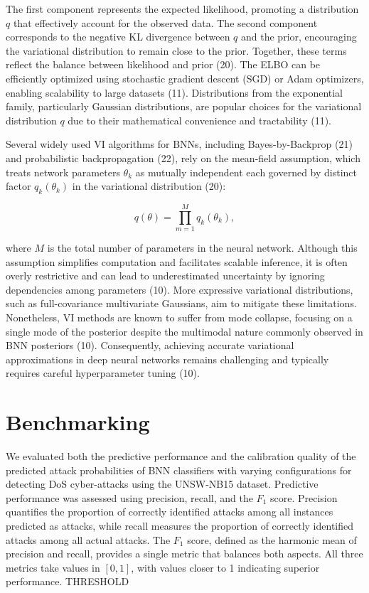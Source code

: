 \documentclass[
  a4paper,
]{scrreprt}
\begin{document}
The first component represents the expected likelihood, promoting a
distribution \(q\) that effectively account for the observed data. The
second component corresponds to the negative KL divergence between \(q\)
and the prior, encouraging the variational distribution to remain close
to the prior. Together, these terms reflect the balance between
likelihood and prior (20). The ELBO can be efficiently optimized using
stochastic gradient descent (SGD) or Adam optimizers, enabling
scalability to large datasets (11). Distributions from the exponential
family, particularly Gaussian distributions, are popular choices for the
variational distribution \(q\) due to their mathematical convenience and
tractability (11).

Several widely used VI algorithms for BNNs, including Bayes-by-Backprop
(21) and probabilistic backpropagation (22), rely on the mean-field
assumption, which treats network parameters \(\theta_k\) as mutually
independent each governed by distinct factor \(q_{k}(\theta_k)\) in the
variational distribution (20):

\[
q(\theta)=\prod_{m=1}^{M}{q_{k}(\theta_k)},
\]

where \(M\) is the total number of parameters in the neural network.
Although this assumption simplifies computation and facilitates scalable
inference, it is often overly restrictive and can lead to underestimated
uncertainty by ignoring dependencies among parameters (10). More
expressive variational distributions, such as full-covariance
multivariate Gaussians, aim to mitigate these limitations. Nonetheless,
VI methods are known to suffer from mode collapse, focusing on a single
mode of the posterior despite the multimodal nature commonly observed in
BNN posteriors (10). Consequently, achieving accurate variational
approximations in deep neural networks remains challenging and typically
requires careful hyperparameter tuning (10).

\section{Benchmarking}\label{benchmarking}

We evaluated both the predictive performance and the calibration quality
of the predicted attack probabilities of BNN classifiers with varying
configurations for detecting DoS cyber-attacks using the UNSW-NB15
dataset. Predictive performance was assessed using precision, recall,
and the \(F_1\) score. Precision quantifies the proportion of correctly
identified attacks among all instances predicted as attacks, while
recall measures the proportion of correctly identified attacks among all
actual attacks. The \(F_1\) score, defined as the harmonic mean of
precision and recall, provides a single metric that balances both
aspects. All three metrics take values in \([0,1]\), with values closer
to 1 indicating superior performance. THRESHOLD
\end{document}
